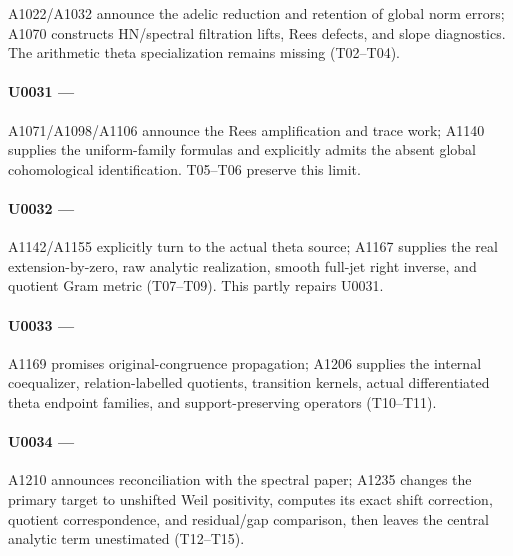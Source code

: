 A1022/A1032 announce the adelic reduction and retention of global norm
errors; A1070 constructs HN/spectral filtration lifts, Rees defects, and
slope diagnostics. The arithmetic theta specialization remains missing
(T02--T04).

\paragraph{\texorpdfstring{U0031 ---
\protect{}}{U0031 --- }}\label{u0031-fd1d4ef4-537b-4bca-8d5b-0cb82a441737}

A1071/A1098/A1106 announce the Rees amplification and trace work; A1140
supplies the uniform-family formulas and explicitly admits the absent
global cohomological identification. T05--T06 preserve this limit.

\paragraph{\texorpdfstring{U0032 ---
\protect{}}{U0032 --- }}\label{u0032-f4609209-f2cd-4dbc-8ec2-a8995aedc998}

A1142/A1155 explicitly turn to the actual theta source; A1167 supplies
the real extension-by-zero, raw analytic realization, smooth full-jet
right inverse, and quotient Gram metric (T07--T09). This partly repairs
U0031.

\paragraph{\texorpdfstring{U0033 ---
\protect{}}{U0033 --- }}\label{u0033-622780af-97a6-4c56-987c-135df8409461}

A1169 promises original-congruence propagation; A1206 supplies the
internal coequalizer, relation-labelled quotients, transition kernels,
actual differentiated theta endpoint families, and support-preserving
operators (T10--T11).

\paragraph{\texorpdfstring{U0034 ---
\protect{}}{U0034 --- }}\label{u0034-b5ee7e11-a089-4433-af7a-ede73bbc5bcf}

A1210 announces reconciliation with the spectral paper; A1235 changes
the primary target to unshifted Weil positivity, computes its exact
shift correction, quotient correspondence, and residual/gap comparison,
then leaves the central analytic term unestimated (T12--T15).

